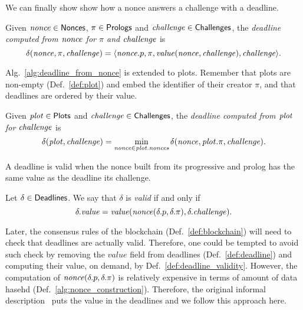 %
We can finally show show how a nonce answers a challenge with a deadline.
%
\begin{alg}[$\delta(\nonce,\pi,\challenge)$]\label{alg:deadline_from_nonce}
  Given ${\mathit{nonce}}\in{\mathsf{Nonces}}$, $\pi\in{\mathsf{Prologs}}$ and ${\mathit{challenge}}\in{\mathsf{Challenges}}$, the
  \emph{deadline computed from ${\mathit{nonce}}$ for $\pi$ and ${\mathit{challenge}}$} is
  \[
  \delta({\mathit{nonce}},\pi,{\mathit{challenge}})=\langle{\mathit{nonce}}.p,\pi,\mathit{value}({\mathit{nonce}},{\mathit{challenge}}),{\mathit{challenge}}\rangle.
  \]
\end{alg}
%
Alg.~\ref{alg:deadline_from_nonce} is extended to plots. Remember that plots are non-empty
(Def.~\ref{def:plot}) and embed the identifier of their creator $\pi$,
and that deadlines are ordered by their value.
%
\begin{alg}[$\deadline(\plot,\challenge)$]\label{alg:deadline_from_plot}
  Given ${\mathit{plot}}\in{\mathsf{Plots}}$ and ${\mathit{challenge}}\in{\mathsf{Challenges}}$, the \emph{deadline computed
  from ${\mathit{plot}}$ for ${\mathit{challenge}}$} is
  \[
  \delta({\mathit{plot}},{\mathit{challenge}})=\min\limits_{{\mathit{nonce}}\in{\mathit{plot}}.{\mathit{nonces}}}\delta({\mathit{nonce}},{\mathit{plot}}.\pi,{\mathit{challenge}}).
  \]
\end{alg}
%
A deadline is valid when the nonce built from its progressive and prolog
has the same value as the deadline \wrt its challenge.
%
\begin{definition}\label{def:deadline_validity}
  Let $\delta\in{\mathsf{Deadlines}}$. We say that $\delta$ is \emph{valid} if and only if
  \[
  \delta.\mathit{value}=\mathit{value}({\mathit{nonce}}(\delta.p,\delta.\pi),\delta.{\mathit{challenge}}).
  \]
\end{definition}
%
Later, the consensus rules of the blockchain (Def.~\ref{def:blockchain})
will need to check that deadlines are actually valid. Therefore, one could be tempted to
avoid such check by removing the $\mathit{value}$ field from deadlines
(Def.~\ref{def:deadline}) and computing
their value, on demand, by Def.~\ref{def:deadline_validity}. However, the
computation of
${\mathit{nonce}}(\delta.p,\delta.\pi)$ is relatively expensive in terms of amount of data hasehd
(Def.~\ref{alg:nonce_construction}).
Therefore, the original informal description~\cite{SignumPlotting} puts the value in the deadlines
and we follow this approach here.
